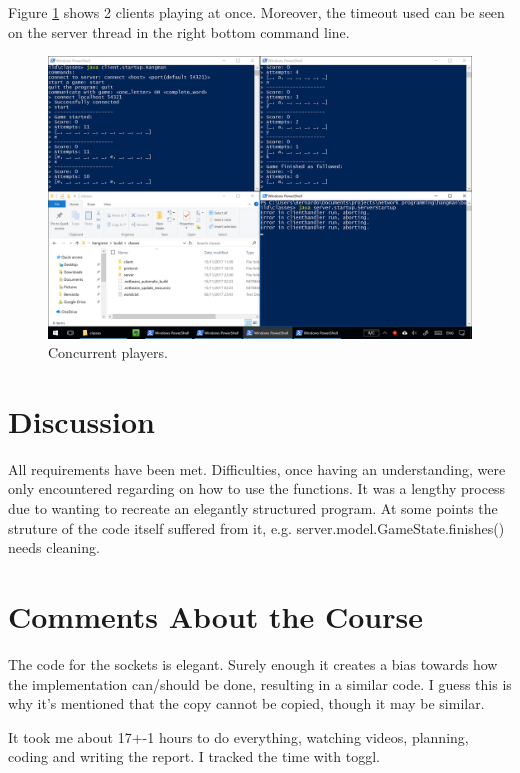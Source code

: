 \documentclass[a4paper]{scrartcl}
\begin{document}
Figure \ref{fig:multiple} shows 2 clients playing at once. Moreover, the timeout used can be seen on the server thread in the right bottom command line.

\begin{figure}[h!]
  \begin{center}
    \includegraphics[scale=0.4]{multiple.png}
    \caption{Concurrent players.}
    \label{fig:multiple}
  \end{center}
\end{figure}

\section{Discussion}

All requirements have been met.
Difficulties, once having an understanding, were only encountered regarding on how to use the functions.
It was a lengthy process due to wanting to recreate an elegantly structured program.
At some points the struture of the code itself suffered from it, e.g. server.model.GameState.finishes() needs cleaning.



\section{Comments About the Course}

The code for the sockets is elegant.
Surely enough it creates a bias towards how the implementation can/should be done, resulting in a similar code.
I guess this is why it's mentioned that the copy cannot be copied, though it may be similar.

It took me about 17+-1 hours to do everything, watching videos, planning, coding and writing the report. I tracked the time with toggl.
\end{document}
